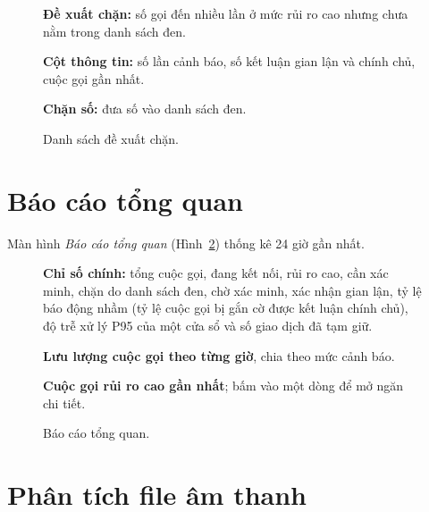 \documentclass[11pt]{article}
\begin{document}
\begin{figure}[tbp]
  \centering
  \caption{Danh sách đề xuất chặn.}
  \label{fig:suggested}
  \begin{flushleft}\small
\begin{legend}
  \item \textbf{Đề xuất chặn:} số gọi đến nhiều lần ở mức rủi ro cao nhưng chưa nằm trong danh sách đen.
  \item \textbf{Cột thông tin:} số lần cảnh báo, số kết luận gian lận và chính chủ, cuộc gọi gần nhất.
  \item \textbf{Chặn số:} đưa số vào danh sách đen.
\end{legend}
  \end{flushleft}
\end{figure}

\section{Báo cáo tổng quan}

Màn hình \emph{Báo cáo tổng quan} (Hình~\ref{fig:overview}) thống kê 24 giờ gần nhất.

\begin{figure}[tbp]
  \centering
  \caption{Báo cáo tổng quan.}
  \label{fig:overview}
  \begin{flushleft}\small
\begin{legend}
  \item \textbf{Chỉ số chính:} tổng cuộc gọi, đang kết nối, rủi ro cao, cần xác minh, chặn do danh sách đen, chờ xác minh, xác nhận gian lận, tỷ lệ báo động nhầm (tỷ lệ cuộc gọi bị gắn cờ được kết luận chính chủ), độ trễ xử lý P95 của một cửa sổ và số giao dịch đã tạm giữ.
  \item \textbf{Lưu lượng cuộc gọi theo từng giờ}, chia theo mức cảnh báo.
  \item \textbf{Cuộc gọi rủi ro cao gần nhất}; bấm vào một dòng để mở ngăn chi tiết.
\end{legend}
  \end{flushleft}
\end{figure}

\section{Phân tích file âm thanh}
\end{document}
